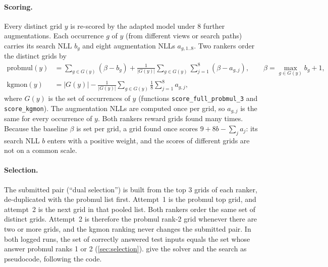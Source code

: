 \documentclass[11pt]{article}
\newcommand{\code}[1]{\texttt{#1}}
\begin{document}
\paragraph{Scoring.}
Every distinct grid $y$ is re-scored by the adapted model under 8 further augmentations. Each occurrence $g$ of $y$ (from different views or search paths) carries its search NLL $b_g$ and eight augmentation NLLs $a_{g,1..8}$.
Two rankers order the distinct grids by
\begin{align}
\text{probmul}(y) &= \sum_{g\in G(y)} (\beta - b_g) + \frac{1}{|G(y)|}\sum_{g\in G(y)}\sum_{j=1}^{8} (\beta - a_{g,j}), \qquad \beta = \max_{g\in G(y)} b_g + 1, \label{eq:probmul}\\
\text{kgmon}(y) &= |G(y)| - \frac{1}{|G(y)|}\sum_{g\in G(y)} \frac{1}{8}\sum_{j=1}^{8} a_{g,j}, \label{eq:kgmon}
\end{align}
where $G(y)$ is the set of occurrences of $y$ (functions \code{score\_full\_probmul\_3} and \code{score\_kgmon}). The augmentation NLLs are computed once per grid, so $a_{g,j}$ is the same for every occurrence of $y$. Both rankers reward grids found many times.
Because the baseline $\beta$ is set per grid, a grid found once scores $9 + 8b - \sum_j a_j$: its search NLL $b$ enters with a positive weight, and the scores of different grids are not on a common scale.

\paragraph{Selection.}
The submitted pair (``dual selection'') is built from the top 3 grids of each ranker, de-duplicated with the probmul list first. Attempt~1 is the probmul top grid, and attempt~2 is the next grid in that pooled list.
Both rankers order the same set of distinct grids. Attempt~2 is therefore the probmul rank-2 grid whenever there are two or more grids, and the kgmon ranking never changes the submitted pair.
In both logged runs, the set of correctly answered test inputs equals the set whose answer probmul ranks 1 or 2 (\cref{sec:selection}).
 give the solver and the search as pseudocode, following the code.
\end{document}
